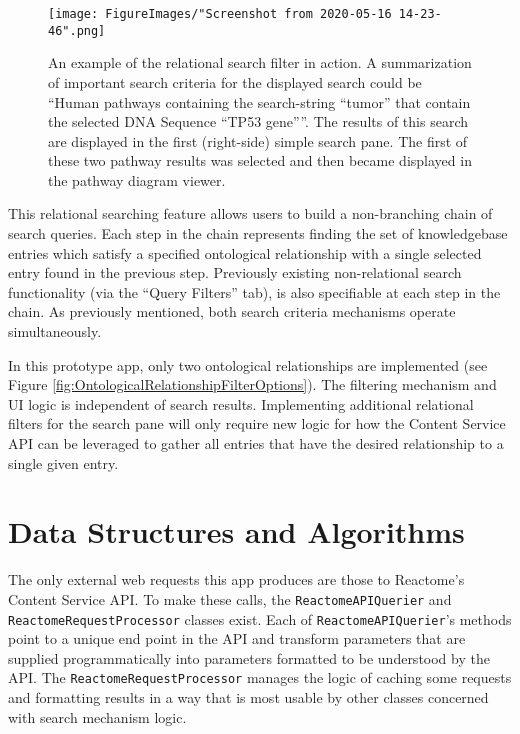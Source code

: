 \documentclass[12pt, letterpaper]{report}
\begin{document}
\begin{figure}[h!]
	\begin{center}
		\texttt{[image: FigureImages/"Screenshot from 2020-05-16 14-23-46".png]}
	\end{center}
	\caption{An example of the relational search filter in action. A summarization of important search criteria for the displayed search could be ``Human pathways containing the search-string ``tumor'' that contain the selected DNA Sequence ``TP53 gene''''. The results of this search are displayed in the first (right-side) simple search pane. The first of these two pathway results was selected and then became displayed in the pathway diagram viewer.}
	\label{fig:RelationalFilterInAction}
\end{figure}

This relational searching feature allows users to build a non-branching chain of search queries. Each step in the chain represents finding the set of knowledgebase entries which satisfy a specified ontological relationship with a single selected entry found in the previous step. Previously existing non-relational search functionality (via the ``Query Filters'' tab), is also specifiable at each step in the chain. As previously mentioned, both search criteria mechanisms operate simultaneously.

In this prototype app, only two ontological relationships are implemented (see Figure \ref{fig:OntologicalRelationshipFilterOptions}). The filtering mechanism and UI logic is independent of search results. Implementing additional relational filters for the search pane will only require new logic for how the Content Service API can be leveraged to gather all entries that have the desired relationship to a single given entry.

\section {Data Structures and Algorithms}
The only external web requests this app produces are those to Reactome's Content Service API. To make these calls, the \verb|ReactomeAPIQuerier| and \verb|ReactomeRequestProcessor| classes exist. Each of \verb|ReactomeAPIQuerier|'s methods point to a unique end point in the API and transform parameters that are supplied programmatically into parameters formatted to be understood by the API. The \verb|ReactomeRequestProcessor| manages the logic of caching some requests and formatting results in a way that is most usable by other classes concerned with search mechanism logic.
\end{document}
